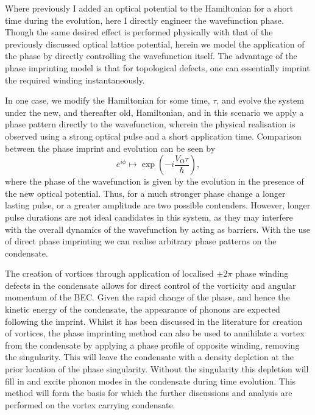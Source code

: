 Where previously I added an optical potential to the Hamiltonian for a short time during the evolution, here I directly engineer the wavefunction phase. Though the same desired effect is performed physically with that of the previously discussed optical lattice potential, herein we model the application of the phase by directly controlling the wavefunction itself. The advantage of the phase imprinting model is that for topological defects, one can essentially imprint the required winding instantaneously.

In one case, we modify the Hamiltonian for some time, $\tau$, and evolve the system under the new, and thereafter old, Hamiltonian, and in this scenario we apply a phase pattern directly to the wavefunction, wherein the physical realisation is observed using a strong optical pulse and a short application time. Comparison between the phase imprint and evolution can be seen by
\begin{equation}
    e^{i\phi} \mapsto \exp\left(-i\frac{V_{\textrm{O}}\tau}{\hbar}\right),
\end{equation}
where the phase of the wavefunction is given by the evolution in the presence of the new optical potential. Thus, for a much stronger phase change a longer lasting pulse, or a greater amplitude are two possible contenders. However, longer pulse durations are not ideal candidates in this system, as they may interfere with the overall dynamics of the wavefunction by acting as barriers. With the use of direct phase imprinting we can realise arbitrary phase patterns on the condensate.

The creation of vortices through application of localised $\pm 2\pi$ phase winding defects in the condensate allows for direct control of the vorticity and angular momentum of the BEC. Given the rapid change of the phase, and hence the kinetic energy of the condensate, the appearance of phonons are expected following the imprint. Whilst it has been discussed in the literature for creation of vortices, the phase imprinting method can also be used to annihilate a vortex from the condensate by applying a phase profile of opposite winding, removing the singularity. This will leave the condensate with a density depletion at the prior location of the phase singularity. Without the singularity this depletion will fill in and excite phonon modes in the condensate during time evolution. This method will form the basis for which the further discussions and analysis are performed on the vortex carrying condensate.

